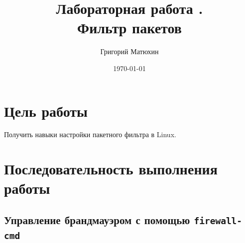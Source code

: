 \documentclass[12pt]{article}
\author{Григорий Матюхин}
\date{\today}
\title{Лабораторная работа \textnumero13.\\Фильтр пакетов}
\begin{document}
\maketitle
\newpage
\tableofcontents
\newpage
\section{Цель работы}
Получить навыки настройки пакетного фильтра в Linux.

\section{Последовательность выполнения работы}
\subsection{Управление брандмауэром с помощью \texttt{firewall-cmd}}
\end{document}
